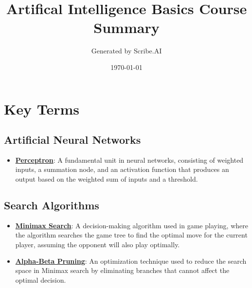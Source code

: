 \documentclass{article}%
\title{Artifical Intelligence Basics Course Summary}%
\author{Generated by Scribe.AI}%
\date{\today}%
\begin{document}
%
\normalsize%
\maketitle%
\section{Key Terms}%
\label{sec:KeyTerms}%
\subsection{Artificial Neural Networks}%
\label{subsec:ArtificialNeuralNetworks}%
\begin{itemize}[leftmargin=*]%
\item \href{\url{https://purdue.brightspace.com/d2l/common/assets/pdfjs-d2l-dist/1.0.14-legacy/web/viewer.html?file=\%252Fcontent\%252Fenforced\%252F1095467-wl.202510.CS.24300.001\%252F02L2-Intro.pdf\%253Fou\%253D1095467\&lang=en-us\&container=d2l-fileviewer-rendered-pdf\&fullscreen=d2l-fileviewer-rendered-pdf-dialog\&height=667}#page=45}{\textbf{Perceptron}}: A fundamental unit in neural networks, consisting of weighted inputs, a summation node, and an activation function that produces an output based on the weighted sum of inputs and a threshold.%
\end{itemize}

%
\subsection{Search Algorithms}%
\label{subsec:SearchAlgorithms}%
\begin{itemize}[leftmargin=*]%
\item \href{\url{https://purdue.brightspace.com/d2l/common/assets/pdfjs-d2l-dist/1.0.14-legacy/web/viewer.html?file=\%252Fcontent\%252Fenforced\%252F1095467-wl.202510.CS.24300.001\%252F02L2-Intro.pdf\%253Fou\%253D1095467\&lang=en-us\&container=d2l-fileviewer-rendered-pdf\&fullscreen=d2l-fileviewer-rendered-pdf-dialog\&height=667}#page=22}{\textbf{Minimax Search}}: A decision-making algorithm used in game playing, where the algorithm searches the game tree to find the optimal move for the current player, assuming the opponent will also play optimally.%
\item \href{\url{https://purdue.brightspace.com/d2l/common/assets/pdfjs-d2l-dist/1.0.14-legacy/web/viewer.html?file=\%252Fcontent\%252Fenforced\%252F1095467-wl.202510.CS.24300.001\%252F02L2-Intro.pdf\%253Fou\%253D1095467\&lang=en-us\&container=d2l-fileviewer-rendered-pdf\&fullscreen=d2l-fileviewer-rendered-pdf-dialog\&height=667}#page=23}{\textbf{Alpha-Beta Pruning}}: An optimization technique used to reduce the search space in Minimax search by eliminating branches that cannot affect the optimal decision.%
\end{itemize}
\end{document}
